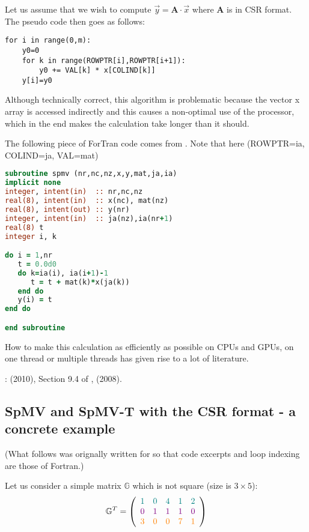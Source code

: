 Let us assume that we wish to compute $\vec{y}={\bm A}\cdot \vec{x}$ where ${\bm A}$ 
is in CSR format. The pseudo code then goes as follows:
\begin{lstlisting}
for i in range(0,m):
    y0=0
    for k in range(ROWPTR[i],ROWPTR[i+1]):
        y0 += VAL[k] * x[COLIND[k]]
    y[i]=y0
\end{lstlisting} 
Although technically correct, this algorithm is problematic because the vector x array
is accessed indirectly and this causes a non-optimal use of the processor, which 
in the end makes the calculation take longer than it should.


The following piece of ForTran code comes from \elefant. 
Note that here (ROWPTR=ia, COLIND=ja, VAL=mat)
\begin{lstlisting}[language=Fortran]
subroutine spmv (nr,nc,nz,x,y,mat,ja,ia)
implicit none
integer, intent(in)  :: nr,nc,nz
real(8), intent(in)  :: x(nc), mat(nz)
real(8), intent(out) :: y(nr)
integer, intent(in)  :: ja(nz),ia(nr+1)
real(8) t
integer i, k

do i = 1,nr
   t = 0.0d0
   do k=ia(i), ia(i+1)-1
      t = t + mat(k)*x(ja(k))
   end do
   y(i) = t 
end do

end subroutine
\end{lstlisting}


How to make this calculation as efficiently as possible on CPUs and GPUs, on one thread 
or multiple threads has given rise to a lot of literature.

\Literature: 
\textcite{krda10} (2010), Section 9.4 of \textcite{knepley}, 
\textcite{widc08} (2008).

\subsection{SpMV and SpMV-T with the CSR format - a concrete example}

(What follows was orignally written for \elefant so that code excerpts and loop indexing 
are those of Fortran.)

Let us consider a simple matrix $\mathbb{G}$ which is not square (size is $3\times5$):
\[
{\mathbb{G}}^T=
\left(
\begin{array}{ccccc}
{\color{teal} 1} & {\color{teal}0}& {\color{teal}4}& {\color{teal}1}& {\color{teal}2}\\
{\color{violet}0}& {\color{violet}1}& {\color{violet}1}& {\color{violet}1}& {\color{violet}0}\\
{\color{orange}3}& {\color{orange}0} & {\color{orange}0}& {\color{orange}7}& {\color{orange}1}
\end{array}
\right)
\]

